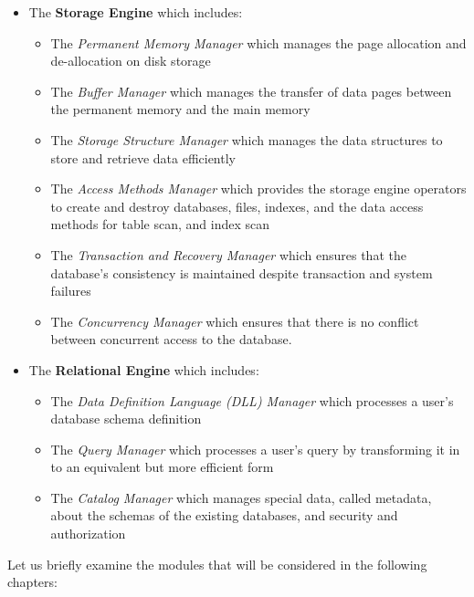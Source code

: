 \begin{itemize}
    \item The \textbf{Storage Engine} which includes:
    \begin{itemize}
        \item The \textit{Permanent Memory Manager} which manages the page allocation and de-allocation on disk storage
        \item The \textit{Buffer Manager} which manages the transfer of data pages between the permanent memory and the main memory
        \item The \textit{Storage Structure Manager} which manages the data structures to store and retrieve data efficiently
        \item The \textit{Access Methods Manager} which provides the storage engine operators to create and destroy databases, files, indexes, and the data access methods for table scan, and index scan
        \item The \textit{Transaction and Recovery Manager} which ensures that the database’s consistency is maintained despite transaction and system failures
        \item The \textit{Concurrency Manager} which ensures that there is no conflict between concurrent access to the database.
    \end{itemize}
    \item The \textbf{Relational Engine} which includes:
    \begin{itemize}
        \item The \textit{Data Definition Language (DLL) Manager} which processes a user’s database schema definition 
        \item The \textit{Query Manager} which processes a user’s query by transforming it in to an equivalent but more efficient form
        \item The \textit{Catalog Manager} which manages special data, called metadata, about the schemas of the existing databases, and security and authorization
    \end{itemize}
\end{itemize}
Let us briefly examine the modules that will be considered in the following chapters:
